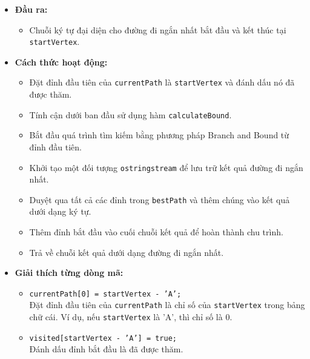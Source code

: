 \documentclass[a4paper]{article}
\begin{document}
\begin{itemize}
\begin{itemize}
    \item \textbf{Đầu ra:}
    \begin{itemize}
        \item Chuỗi ký tự đại diện cho đường đi ngắn nhất bắt đầu và kết thúc tại \texttt{startVertex}.
    \end{itemize}

    \item \textbf{Cách thức hoạt động:}
    \begin{itemize}
        \item Đặt đỉnh đầu tiên của \texttt{currentPath} là \texttt{startVertex} và đánh dấu nó đã được thăm.
        
        \item Tính cận dưới ban đầu sử dụng hàm \texttt{calculateBound}.
        
        \item Bắt đầu quá trình tìm kiếm bằng phương pháp Branch and Bound từ đỉnh đầu tiên.
        
        \item Khởi tạo một đối tượng \texttt{ostringstream} để lưu trữ kết quả đường đi ngắn nhất.
        
        \item Duyệt qua tất cả các đỉnh trong \texttt{bestPath} và thêm chúng vào kết quả dưới dạng ký tự.
        
        \item Thêm đỉnh bắt đầu vào cuối chuỗi kết quả để hoàn thành chu trình.
        
        \item Trả về chuỗi kết quả dưới dạng đường đi ngắn nhất.
        
    \end{itemize}
\end{itemize}

\begin{itemize}
    \item \textbf{Giải thích từng dòng mã:}
    \begin{itemize}
        \item \texttt{currentPath[0] = startVertex - 'A';} \\ 
        Đặt đỉnh đầu tiên của \texttt{currentPath} là chỉ số của \texttt{startVertex} trong bảng chữ cái. Ví dụ, nếu \texttt{startVertex} là 'A', thì chỉ số là 0.

        \item \texttt{visited[startVertex - 'A'] = true;} \\ 
        Đánh dấu đỉnh bắt đầu là đã được thăm.


\end{itemize}
\end{itemize}
\end{itemize}
\end{document}
